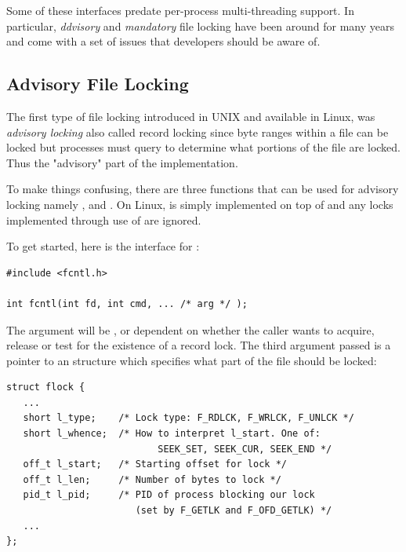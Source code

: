 Some of these interfaces predate per-process multi-threading support. In particular, \textit{ddvisory} and \textit{mandatory} file locking have been around for many years and come with a set of issues that developers should be aware of. 


\subsection{Advisory File Locking}

The first type of file locking introduced in UNIX and available in Linux, was \textit{advisory locking} also called record locking since byte ranges within a file can be locked but processes must query to determine what portions of the file are locked. Thus the "advisory" part of the implementation.

To make things confusing, there are three functions that can be used for advisory locking namely ,  and . On Linux,  is simply implemented on top of  and any locks implemented through use of  are ignored.

To get started, here is the interface for :

\begin{lstlisting}
#include <fcntl.h>

int fcntl(int fd, int cmd, ... /* arg */ );
\end{lstlisting}

\noindent
The  argument will be ,   or  dependent on whether the caller wants to acquire, release or test for the existence of a record lock. The third argument passed is a pointer to an  structure which specifies what part of the file should be locked:
\begin{lstlisting}
struct flock {
   ... 
   short l_type;    /* Lock type: F_RDLCK, F_WRLCK, F_UNLCK */
   short l_whence;  /* How to interpret l_start. One of:
                           SEEK_SET, SEEK_CUR, SEEK_END */
   off_t l_start;   /* Starting offset for lock */
   off_t l_len;     /* Number of bytes to lock */
   pid_t l_pid;     /* PID of process blocking our lock
                       (set by F_GETLK and F_OFD_GETLK) */
   ... 
}; 
\end{lstlisting}

